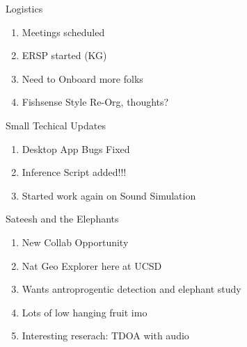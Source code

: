 \begin{frame}{Logistics}
    \begin{enumerate}
        \item Meetings scheduled
        \item ERSP started (KG)
        \item Need to Onboard more folks
        \item Fishsense Style Re-Org, thoughts?
    \end{enumerate}
\end{frame}
\begin{frame}{Small Techical Updates}
    \begin{enumerate}
        \item Desktop App Bugs Fixed
        \item Inference Script added!!!
        \item Started work again on Sound Simulation
    \end{enumerate}
\end{frame}
\begin{frame}{Sateesh and the Elephants}
    \begin{enumerate}
        \item New Collab Opportunity
        \item Nat Geo Explorer here at UCSD
        \item Wants antroprogentic detection and elephant study
        \item Lots of low hanging fruit imo
        \item Interesting reserach: TDOA with audio
    \end{enumerate}
\end{frame}
